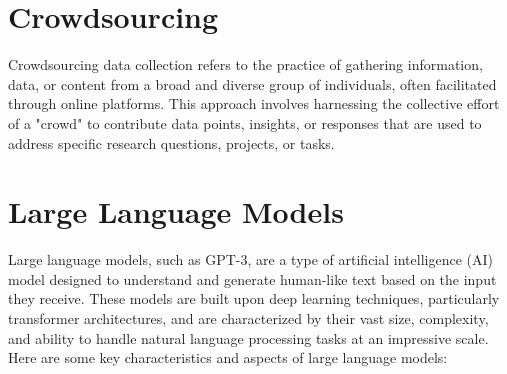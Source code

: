 \section{Crowdsourcing}
Crowdsourcing data collection refers to the practice of gathering information, data, or content from a broad and diverse group of individuals, often facilitated through online platforms. This approach involves harnessing the collective effort of a "crowd" to contribute data points, insights, or responses that are used to address specific research questions, projects, or tasks.


\section{Large Language Models}
Large language models, such as GPT-3, are a type of artificial intelligence (AI) model designed to understand and generate human-like text based on the input they receive. These models are built upon deep learning techniques, particularly transformer architectures, and are characterized by their vast size, complexity, and ability to handle natural language processing tasks at an impressive scale. Here are some key characteristics and aspects of large language models:

